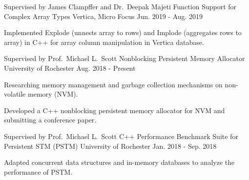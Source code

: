 

\begin{cventries}

  \cventry
    {Supervised by James Clampffer and Dr.\ Deepak Majeti} %
    {Function Support for Complex Array Types} %
    {Vertica, Micro Focus} %
    {Jun. 2019 - Aug. 2019} %
    {
      \begin{cvitems} %
        \item {Implemented Explode (unnests array to rows) and Implode (aggregates rows to array) in C++ for array column manipulation in Vertica database.}
      \end{cvitems}
    }

  \cventry
    {Supervised by Prof.\ Michael L.\ Scott} %
    {Nonblocking Persistent Memory Allocator} %
    {University of Rochester} %
    {Aug. 2018 - Present} %
    {
      \begin{cvitems} %
        \item {Researching memory management and garbage collection mechanisms on non-volatile memory (NVM).}
        \item {Developed a C++ nonblocking persistent memory allocator for NVM and submitting a conference paper.}
      \end{cvitems}
	  }

  \cventry
    {Supervised by Prof.\ Michael L.\ Scott} %
    {C++ Performance Benchmark Suite for Persistent STM (PSTM)} %
    {University of Rochester} %
    {Jan. 2018 - Sep. 2018} %
    {
      \begin{cvitems} %
        \item {Adapted concurrent data structures and in-memory databases to analyze the performance of PSTM.}
      \end{cvitems}
    }


\end{cventries}
